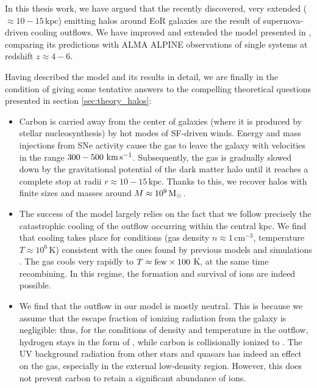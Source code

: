 

\vspace{13pt}


In this thesis work, we have argued that the recently discovered, very extended ($\approx 10-15\,\mathrm{kpc}$) \CII emitting halos around EoR galaxies are the result of supernova-driven cooling outflows. We have improved and extended the model presented in \citet{Pizzati20}, comparing its predictions with ALMA ALPINE observations of single systems at redshift $z\approx4-6$.

Having described the model and its results in detail, we are finally in the condition of giving some tentative answers to the compelling theoretical questions presented in section \ref{sec:theory_halos}:
\begin{itemize}
    \item Carbon is carried away from the center of galaxies (where it is produced by stellar nucleosynthesis) by hot modes of SF-driven winds. Energy and mass injections from SNe activity cause the gas to leave the galaxy with velocities in the range $300-500\,\,\rm km\,s^{-1}$. Subsequently, the gas is gradually slowed down by the gravitational potential of the dark matter halo until it reaches a complete stop at radii $r\approx 10-15\,\mathrm{kpc}$. Thanks to this, we recover halos with finite sizes and masses around $M\approx 10^9\,{\rm M}_{\odot}$.
    \item The success of the model largely relies on the fact that we follow precisely the catastrophic cooling of the outflow occurring within the central kpc. We find that cooling takes place for conditions (gas density $n\approx 1 \,\mathrm{cm}^{-3}$, temperature $T\approx 10^6\,\mathrm{K}$) consistent with the ones found by previous models and simulations \citep{Thompson16, Scannapieco:2017, gray2019catastrophic, danehkar_2021, fielding2021}. The gas cools very rapidly to $T \approx {\rm few} \times 100$ K, at the same time recombining. In this regime, the formation and survival of \CIIion ions are indeed possible. 
    \item We find that the outflow in our model is mostly neutral. This is because we assume that the escape fraction of ionizing radiation from the galaxy is negligible: thus, for the conditions of density and temperature in the outflow, hydrogen stays in the form of \HI, while carbon is collisionally ionized to \CIIion. The UV background radiation from other stars and quasars has indeed an effect on the gas, especially in the external low-density region. However, this does not prevent carbon to retain a significant abundance of \CIIion ions. 

\end{itemize}
